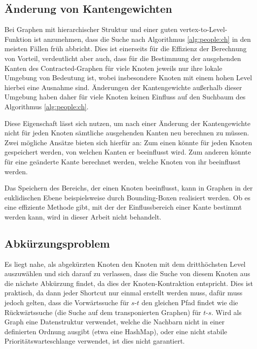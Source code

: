 \subsection{Änderung von Kantengewichten}

Bei Graphen mit hierarchischer Struktur und einer guten vertex-to-Level-Funktion ist anzunehmen, dass die Suche nach Algorithmus \ref{alg:people:ch}  in den meisten Fällen früh abbricht.
Dies ist einerseits für die Effizienz der Berechnung von Vorteil, verdeutlicht aber auch, dass für die Bestimmung der ausgehenden Kanten des Contracted-Graphen für viele Knoten jeweils nur ihre lokale Umgebung von Bedeutung ist, wobei insbesondere Knoten mit einem hohen Level hierbei eine Ausnahme sind.
Änderungen der Kantengewichte außerhalb dieser Umgebung haben daher für viele Knoten keinen Einfluss auf den Suchbaum des Algorithmus \ref{alg:people:ch}.

Diese Eigenschaft lässt sich nutzen, um nach einer Änderung der Kantengewichte nicht für jeden Knoten sämtliche ausgehenden Kanten neu berechnen zu müssen.
Zwei mögliche Ansätze bieten sich hierfür an:
Zum einen könnte für jeden Knoten gespeichert werden, von welchen Kanten er beeinflusst wird.
Zum anderen könnte für eine geänderte Kante berechnet werden, welche Knoten von ihr beeinflusst werden.

Das Speichern des Bereichs, der einen Knoten beeinflusst, kann in Graphen in der euklidischen Ebene beispielsweise durch Bounding-Boxen realisiert werden.
Ob es eine effiziente Methode gibt, mit der der Einflussbereich einer Kante bestimmt werden kann, wird in dieser Arbeit nicht behandelt.

\subsection{Abkürzungsproblem}

Es liegt nahe, als abgekürzten Knoten den Knoten mit dem dritthöchsten Level auszuwählen und sich darauf zu verlassen, dass die Suche von diesem Knoten aus die nächste Abkürzung findet, da dies der Knoten-Kontraktion entspricht.
Dies ist praktisch, da dann jeder Shortcut nur einmal erstellt werden muss, dafür muss jedoch gelten, dass die Vorwärtssuche für $s$-$t$ den gleichen Pfad findet wie die Rückwärtssuche (die Suche auf dem transponierten Graphen) für $t$-$s$.
Wird als Graph eine Datenstruktur verwendet, welche die Nachbarn nicht in einer definierten Ordnung ausgibt (etwa eine HashMap), oder eine nicht stabile Prioritätswarteschlange verwendet, ist dies nicht garantiert.

